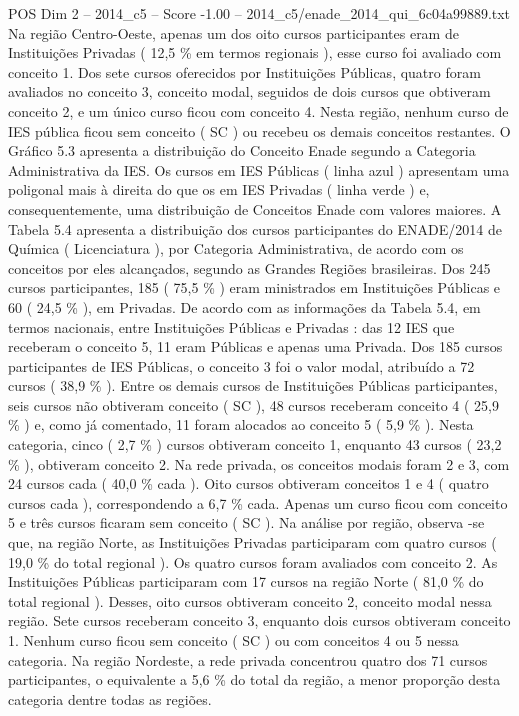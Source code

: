 \begin{textsample}{POS Dim 2 – 2014\_c5 – Score -1.00 – 2014\_c5/enade\_2014\_qui\_6c04a99889.txt}
Na região Centro-Oeste, apenas um dos oito cursos participantes eram de Instituições Privadas ( 12,5 \% em termos regionais ), esse curso foi avaliado com conceito 1.
Dos sete cursos oferecidos por Instituições Públicas, quatro foram avaliados no conceito 3, conceito modal, seguidos de dois cursos que obtiveram conceito 2, e um único curso ficou com conceito 4.
Nesta região, nenhum curso de IES pública ficou sem conceito ( SC ) ou recebeu os demais conceitos restantes.
O Gráfico 5.3 apresenta a distribuição do Conceito Enade segundo a Categoria Administrativa da IES.
Os cursos em IES Públicas ( linha azul ) apresentam uma poligonal mais à direita do que os em IES Privadas ( linha verde ) e, consequentemente, uma distribuição de Conceitos Enade com valores maiores.
A Tabela 5.4 apresenta a distribuição dos cursos participantes do ENADE/2014 de Química ( Licenciatura ), por Categoria Administrativa, de acordo com os conceitos por eles alcançados, segundo as Grandes Regiões brasileiras.
Dos 245 cursos participantes, 185 ( 75,5 \% ) eram ministrados em Instituições Públicas e 60 ( 24,5 \% ), em Privadas.
De acordo com as informações da Tabela 5.4, em termos nacionais, entre Instituições Públicas e Privadas : das 12 IES que receberam o conceito 5, 11 eram Públicas e apenas uma Privada.
Dos 185 cursos participantes de IES Públicas, o conceito 3 foi o valor modal, atribuído a 72 cursos ( 38,9 \% ).
Entre os demais cursos de Instituições Públicas participantes, seis cursos não obtiveram conceito ( SC ), 48 cursos receberam conceito 4 ( 25,9 \% ) e, como já comentado, 11 foram alocados ao conceito 5 ( 5,9 \% ).
Nesta categoria, cinco ( 2,7 \% ) cursos obtiveram conceito 1, enquanto 43 cursos ( 23,2 \% ), obtiveram conceito 2.
Na rede privada, os conceitos modais foram 2 e 3, com 24 cursos cada ( 40,0 \% cada ).
Oito cursos obtiveram conceitos 1 e 4 ( quatro cursos cada ), correspondendo a 6,7 \% cada.
Apenas um curso ficou com conceito 5 e três cursos ficaram sem conceito ( SC ).
Na análise por região, observa -se que, na região Norte, as Instituições Privadas participaram com quatro cursos ( 19,0 \% do total regional ).
Os quatro cursos foram avaliados com conceito 2.
As Instituições Públicas participaram com 17 cursos na região Norte ( 81,0 \% do total regional ).
Desses, oito cursos obtiveram conceito 2, conceito modal nessa região.
Sete cursos receberam conceito 3, enquanto dois cursos obtiveram conceito 1.
Nenhum curso ficou sem conceito ( SC ) ou com conceitos 4 ou 5 nessa categoria.
Na região Nordeste, a rede privada concentrou quatro dos 71 cursos participantes, o equivalente a 5,6 \% do total da região, a menor proporção desta categoria dentre todas as regiões.

\end{textsample}
